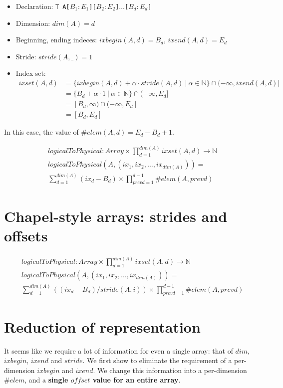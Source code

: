 \documentclass{article}
\newcommand{\naturals}{\mathbb{N}}
\begin{document}
\begin{itemize}
    \renewcommand\labelitemi{--}
    \item Declaration: \texttt{T A[$B_1:E_1$][$B_2:E_2$]$\dots$[$B_d:E_d$]}
    \item Dimension: $dim(A) = d$
    \item Beginning, ending indeces: $ixbegin(A, d) = B_d$, $ixend(A, d) = E_d$
    \item Stride: $stride(A, \_) = 1$
    \item Index set: 
        \begin{align*}
            ixset(A, d) &= \{ ixbegin(A, d) + \alpha \cdot stride(A, d)~\vert~ \alpha \in \naturals \} \cap (-\infty, ixend(A, d) ] \\
                        &= \{ B_d + \alpha \cdot 1~\vert~\alpha \in \naturals \} \cap (-\infty, E_d ] \\
                        &= [B_d, \infty) \cap (-\infty, E_d]\\
                        &= [ B_d, E_d]
        \end{align*}
\end{itemize}

In this case, the value of  $\#elem(A, d) = E_d - B_d + 1$.


\begin{align*}
    &logicalToPhysical: Array \times \prod_{d=1}^{dim(A)} ixset(A, d) \to \naturals \\
    &logicalToPhysical(A, (ix_1, ix_2, \dots, ix_{dim(A)})) = \\
    &\sum_{d=1}^{dim(A)} (ix_d - B_d) \times \prod_{prevd=1}^{d - 1} \#elem(A, prevd)
\end{align*}


\section{Chapel-style arrays: strides and offsets}

\begin{align*}
    &logicalToPhysical: Array \times \prod_{d=1}^{dim(A)} ixset(A, d) \to \naturals \\
    &logicalToPhysical(A, (ix_1, ix_2, \dots, ix_{dim(A)})) = \\
    &\sum_{d=1}^{dim(A)} ((ix_d - B_d) / stride(A, i)) \times \prod_{prevd=1}^{d - 1} \#elem(A, prevd)
\end{align*}

\section{Reduction of representation}
It seems like we require a lot of information for even a single array:
that of $dim$, $ixbegin$, $ixend$ and $stride$.  We first show
to eliminate the requirement of a per-dimension $ixbegin$ and $ixend$. We
change this information into a per-dimension $\#elem$, and a 
\textbf{single $offset$ value for an entire array}. 
\end{document}
